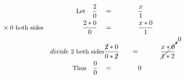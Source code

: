 \begin{alignat*}{5}
&\,&\small\text{Let}\normalsize\quad\frac{2}{0}\quad&=\quad&&\frac{x}{1}\\
&\times\small\text{0 both sides}&\frac{2*0}{0}\quad&=&&\frac{x*0}{1}\\
&\,&divide\small\text{ 2 both sides}&\frac{\cancel{2}*0}{0*\cancel{2}}\quad&=&&\cancelto{0}{\frac{x*0}{1*2}}\\
&\,&\small\text{Thus}\quad\frac{0}{0}\quad&=&&0
\end{alignat*}
